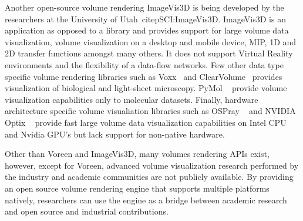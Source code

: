 Another open-source volume rendering ImageVis3D is being developed by the researchers
at the University of Utah~citep{SCI:ImageVis3D}. ImageVis3D is an application as opposed
to a library and provides support for large volume data visualization, volume visualization
on a desktop and mobile device, MIP, 1D and 2D transfer functions amongst many others.
It does not support Virtual Reality environments and the flexibility of a data-flow networks.
Few other data type specific volume rendering libraries such as Voxx~\citep{clendenon2002voxx}
and ClearVolume~\cite{royer2015clearvolume} provides visualization of biological and
light-sheet microscopy. PyMol ~\cite{delano2002pymol} provide volume visualization capabilities
only to molecular datasets. Finally, hardware architecture specific volume visualiation libraries
such as OSPray ~\cite{wald2017ospray} and NVIDIA Optix ~\citep{parker2010optix} provide fast
large volume data visualization capabilities on Intel CPU and Nvidia GPU's but lack support
for non-native hardware.

Other than Voreen and ImageVis3D, many volumes rendering APIs exist, however, except for
Voreen, advanced volume visualization research performed by the industry and
academic communities are not publicly available. By providing an open source volume rendering
engine that supports multiple platforms natively,  researchers can use the engine as a bridge
between academic research and open source and industrial contributions.
